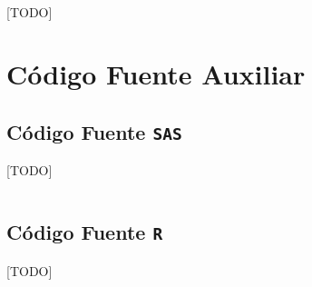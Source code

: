 \documentclass[a4paper, spanish]{article}
\begin{document}
    \paragraph{}
    [TODO]

  \appendix
  \section{Código Fuente Auxiliar}
  \label{appendix:source_code}

    \subsection{Código Fuente \texttt{SAS}}
    \label{appendix:source_code_sas}
      [TODO]

      \begin{listing}[htb!]
        \centering
        \inputminted{SAS}{./res/code/a-01-data.sas}
        \caption{Generación del conjunto de datos \texttt{EJ2.SEMANAL}}
        \label{code:data_import}
      \end{listing}


    \subsection{Código Fuente \texttt{R}}
    \label{appendix:source_code_r}
      [TODO]

      \begin{listing}[htb!]
        \centering
        \inputminted{SAS}{./res/code/r/semanal.r}
        \caption{[TODO]}
        \label{code:semanal_analysis}
      \end{listing}
\end{document}
